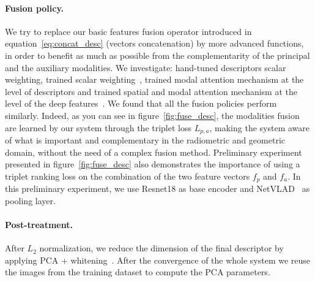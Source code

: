 \paragraph{Fusion policy.}
We try to replace our basic features fusion operator introduced in equation~\ref{eq:concat_desc} (vectors concatenation) by more advanced functions, in order to benefit as much as possible from the complementarity of the principal and the auxiliary modalities. We investigate: hand-tuned descriptors scalar weighting, trained scalar weighting~\cite{Sizikova2016}, trained modal attention mechanism at the level of descriptors and trained spatial and modal attention mechanism at the level of the deep features~\citep{Seymour2018}. We found that all the fusion policies perform similarly. Indeed, as you can see in figure~\ref{fig:fuse_desc}, the modalities fusion are learned by our system through the triplet loss $L_{p, a}$, making the system aware of what is important and complementary in the radiometric and geometric domain, without the need of a complex fusion method. Preliminary experiment presented in figure~\ref{fig:fuse_desc} also demonstrates the importance of using a triplet ranking loss on the combination of the two feature vectors $f_p$ and $f_a$. In this preliminary experiment, we use Resnet18 as base encoder and NetVLAD~\citep{Arandjelovic2017} as pooling layer.

\paragraph{Post-treatment.}
After $L_2$ normalization, we reduce the dimension of the final descriptor by applying PCA + whitening~\citep{Arandjelovic2017, Radenovic2016, Radenovic2017, Gordo2017}. After the convergence of the whole system we reuse the images from the training dataset to compute the PCA parameters.